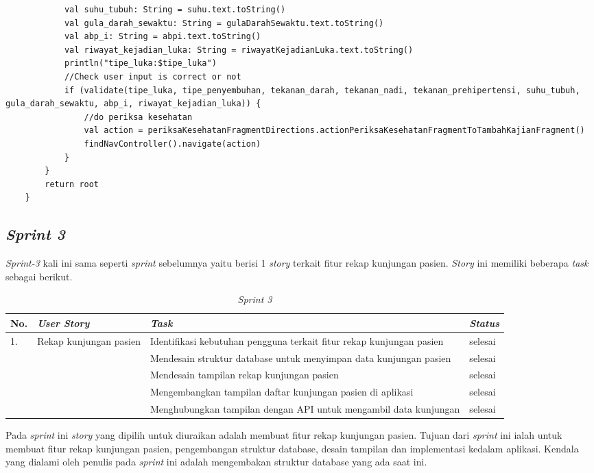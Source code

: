 \begin{enumerate}
\begin{lstlisting}
            val suhu_tubuh: String = suhu.text.toString()
            val gula_darah_sewaktu: String = gulaDarahSewaktu.text.toString()
            val abp_i: String = abpi.text.toString()
            val riwayat_kejadian_luka: String = riwayatKejadianLuka.text.toString()
            println("tipe_luka:$tipe_luka")
            //Check user input is correct or not
            if (validate(tipe_luka, tipe_penyembuhan, tekanan_darah, tekanan_nadi, tekanan_prehipertensi, suhu_tubuh, gula_darah_sewaktu, abp_i, riwayat_kejadian_luka)) {
                //do periksa kesehatan
                val action = periksaKesehatanFragmentDirections.actionPeriksaKesehatanFragmentToTambahKajianFragment()
                findNavController().navigate(action)
            }
        }
        return root
    }
	\end{lstlisting}
	

\end{enumerate}

\subsection{\textit{Sprint 3}}
\textit{Sprint-3} kali ini sama seperti \textit{sprint} sebelumnya yaitu berisi 1 \textit{story} terkait fitur rekap kunjungan pasien. \textit{Story} ini memiliki beberapa \textit{task} sebagai berikut.
\begin{table}[H]
	\caption{\textit{Sprint 3}}
	\label{sprint3_backlog}
	\begin{tabular}{@{} |p{0.5cm}|p{5cm}|p{5cm}|p{2cm}| @{}}
		\hline
		\textbf{No.} & \textbf{\textit{User Story}} & \textbf{\textit{Task}} & \textbf{\textit{Status}} \\
		\hline
		\multirow{3}{3cm}{1.} & \multirow{3}{5cm}{Rekap kunjungan pasien} & Identifikasi kebutuhan pengguna terkait fitur rekap kunjungan pasien & selesai\\
		\cline{3-4}
		 & & Mendesain struktur database untuk menyimpan data kunjungan pasien & selesai\\
		\cline{3-4}
		 & & Mendesain tampilan rekap kunjungan pasien & selesai\\
		\cline{3-4}
		 & & Mengembangkan tampilan daftar kunjungan pasien di aplikasi & selesai\\
		 \cline{3-4}
		 & & Menghubungkan tampilan dengan API untuk mengambil data kunjungan & selesai\\
		\hline
	\end{tabular}
	\end{table}
Pada \textit{sprint} ini \textit{story} yang dipilih untuk diuraikan adalah membuat fitur rekap kunjungan pasien. Tujuan dari \textit{sprint} ini ialah untuk membuat fitur rekap kunjungan pasien, pengembangan struktur database, desain tampilan dan implementasi kedalam aplikasi. Kendala yang dialami oleh penulis pada \textit{sprint} ini adalah mengembakan struktur database yang ada saat ini.


